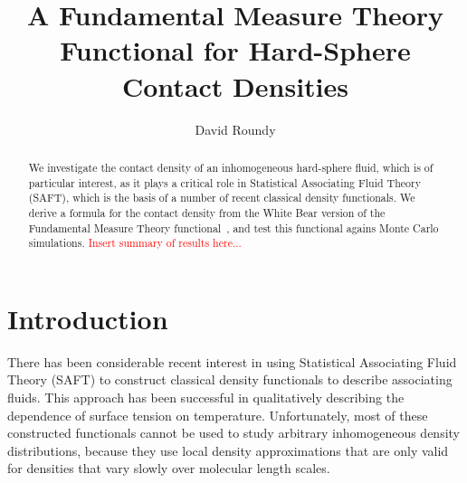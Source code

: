 \documentclass[letterpaper,twocolumn,amsmath,amssymb,prb]{revtex4-1}
\begin{document}
\title{A Fundamental Measure Theory Functional for Hard-Sphere Contact Densities}

\author{David Roundy}

\begin{abstract}
  We investigate the contact density of an inhomogeneous hard-sphere
  fluid, which is of particular interest, as it plays a critical role
  in Statistical Associating Fluid Theory (SAFT), which is the basis
  of a number of recent classical density functionals.  We derive a
  formula for the contact density from the White Bear version of the
  Fundamental Measure Theory functional~\cite{roth2002whitebear}, and
  test this functional agains Monte Carlo simulations.
  \textcolor{red}{Insert summary of results here...}
\end{abstract}

\maketitle

%

\section{Introduction}

\newcommand\saftlocaldft{felipe2001examination, gloor2002saft,%
  gloor2004accurate, clark2006developing, gloor2007prediction,%
  kahl2008modified, gross2009density}
\newcommand\saftnonlocaldft{yu2002fmt-dft-inhomogeneous-associating,%
  fu2005vapor-liquid-dft,bryk2006density}

There has been considerable recent interest in using Statistical
Associating Fluid Theory (SAFT) to construct classical density
functionals to describe associating
fluids\cite{\saftlocaldft,\saftnonlocaldft}.  This approach has been
successful in qualitatively describing the dependence of surface
tension on temperature.  Unfortunately, most of these constructed
functionals\cite{\saftlocaldft} cannot be used to study arbitrary
inhomogeneous density distributions, because they use local
density approximations that are only valid for densities that vary
slowly over molecular length scales.
\end{document}
